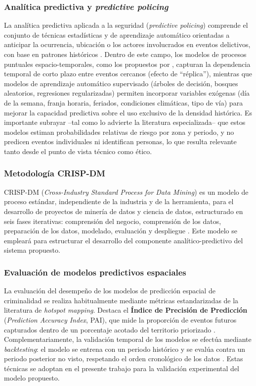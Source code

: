 \documentclass[12pt,letterpaper]{report}
\begin{document}
\subsubsection{Analítica predictiva y \textit{predictive policing}}
La analítica predictiva aplicada a la seguridad (\textit{predictive policing}) comprende el conjunto de t\'ecnicas estad\'isticas y de aprendizaje autom\'atico orientadas a anticipar la ocurrencia, ubicaci\'on o los actores involucrados en eventos delictivos, con base en patrones hist\'oricos \citep{perry2013predictive}. Dentro de este campo, los modelos de procesos puntuales espacio-temporales, como los propuestos por \citet{mohler2011selfexciting}, capturan la dependencia temporal de corto plazo entre eventos cercanos (efecto de ``r\'eplica''), mientras que modelos de aprendizaje autom\'atico supervisado (\'arboles de decisi\'on, bosques aleatorios, regresiones regularizadas) permiten incorporar variables ex\'ogenas (d\'ia de la semana, franja horaria, feriados, condiciones clim\'aticas, tipo de v\'ia) para mejorar la capacidad predictiva sobre el uso exclusivo de la densidad hist\'orica. Es importante subrayar --tal como lo advierte la literatura especializada-- que estos modelos estiman probabilidades relativas de riesgo por zona y periodo, y no predicen eventos individuales ni identifican personas, lo que resulta relevante tanto desde el punto de vista t\'ecnico como \'etico.

\subsubsection{Metodolog\'ia CRISP-DM}
CRISP-DM (\textit{Cross-Industry Standard Process for Data Mining}) es un modelo de proceso est\'andar, independiente de la industria y de la herramienta, para el desarrollo de proyectos de miner\'ia de datos y ciencia de datos, estructurado en seis fases iterativas: comprensi\'on del negocio, comprensi\'on de los datos, preparaci\'on de los datos, modelado, evaluaci\'on y despliegue \citep{crispdm2000}. Este modelo se emplear\'a para estructurar el desarrollo del componente anal\'itico-predictivo del sistema propuesto.

\subsubsection{Evaluaci\'on de modelos predictivos espaciales}
La evaluaci\'on del desempe\~no de los modelos de predicci\'on espacial de criminalidad se realiza habitualmente mediante m\'etricas estandarizadas de la literatura de \textit{hotspot mapping}. Destaca el \textbf{\'Indice de Precisi\'on de Predicci\'on} (\textit{Prediction Accuracy Index}, PAI), que mide la proporci\'on de eventos futuros capturados dentro de un porcentaje acotado del territorio priorizado \citep{chainey2008kde}. Complementariamente, la validaci\'on temporal de los modelos se efect\'ua mediante \textit{backtesting}: el modelo se entrena con un periodo hist\'orico y se eval\'ua contra un periodo posterior no visto, respetando el orden cronol\'ogico de los datos \citep{perry2013predictive}. Estas t\'ecnicas se adoptan en el presente trabajo para la validaci\'on experimental del modelo propuesto.
\end{document}
